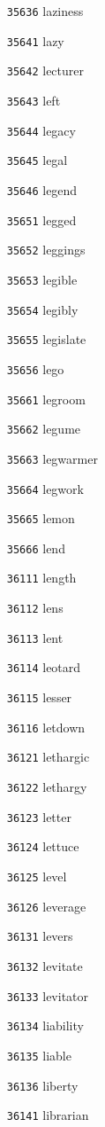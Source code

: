 \documentclass[twoside,11pt]{article}
\begin{document}
\begin{multicols}{5}
\begin{enumerate}
\item[\texttt{35636}] laziness
\item[\texttt{35641}] lazy
\item[\texttt{35642}] lecturer
\item[\texttt{35643}] left
\item[\texttt{35644}] legacy
\item[\texttt{35645}] legal
\item[\texttt{35646}] legend
\item[\texttt{35651}] legged
\item[\texttt{35652}] leggings
\item[\texttt{35653}] legible
\item[\texttt{35654}] legibly
\item[\texttt{35655}] legislate
\item[\texttt{35656}] lego
\item[\texttt{35661}] legroom
\item[\texttt{35662}] legume
\item[\texttt{35663}] legwarmer
\item[\texttt{35664}] legwork
\item[\texttt{35665}] lemon
\item[\texttt{35666}] lend
\item[\texttt{36111}] length
\item[\texttt{36112}] lens
\item[\texttt{36113}] lent
\item[\texttt{36114}] leotard
\item[\texttt{36115}] lesser
\item[\texttt{36116}] letdown
\item[\texttt{36121}] lethargic
\item[\texttt{36122}] lethargy
\item[\texttt{36123}] letter
\item[\texttt{36124}] lettuce
\item[\texttt{36125}] level
\item[\texttt{36126}] leverage
\item[\texttt{36131}] levers
\item[\texttt{36132}] levitate
\item[\texttt{36133}] levitator
\item[\texttt{36134}] liability
\item[\texttt{36135}] liable
\item[\texttt{36136}] liberty
\item[\texttt{36141}] librarian

\end{enumerate}
\end{multicols}
\end{document}
